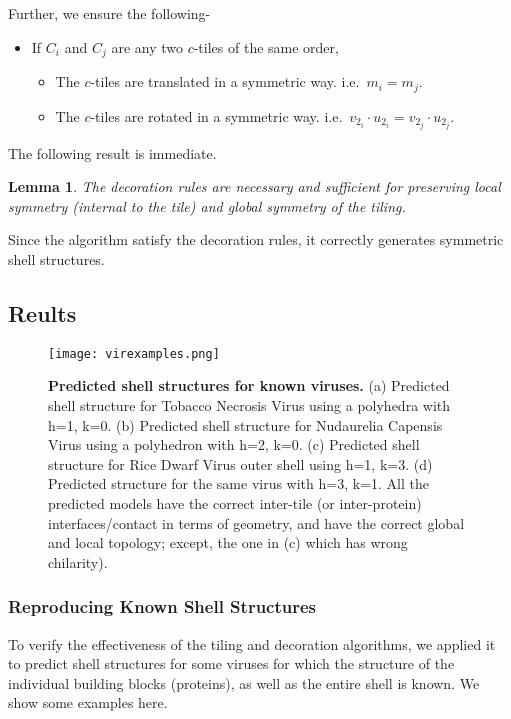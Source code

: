 \documentclass[11pt]{article}
\def\func#1{\textrm{\bf{\sc{#1}}}}
\newtheorem{lemma}[thm]{Lemma}
\newcommand{\1}{\mathds{1}}
\begin{document}
Further, we ensure the following-
\begin{itemize}
 \item If $C_i$ and $C_j$ are any two $c$-tiles of the same order,
   \begin{itemize}
      \item The $c$-tiles are translated in a symmetric way. i.e.\ $m_i = m_j$.
      \item The $c$-tiles are rotated in a symmetric way. i.e.\ $v_{2_i} \cdot u_{2_i} = v_{2_j} \cdot u_{2_j}$.
   \end{itemize}
\end{itemize}

The following result is immediate.

\begin{lemma}
 The decoration rules are necessary and sufficient for preserving local symmetry (internal to the tile) and global symmetry of the tiling.
\end{lemma}

Since the \func{ShellGen} algorithm satisfy the decoration rules, it correctly generates symmetric shell structures.


\subsection{Reults}

\begin{figure}[t!]
\centering
\vspace{-0.3cm}
 \texttt{[image: virexamples.png]}
\vspace{-0.2cm}
\caption[Predicted shell structures for known viruses] {\textbf{Predicted shell structures for known viruses.} (a) Predicted shell structure for Tobacco Necrosis Virus using a polyhedra with h=1, k=0. (b) Predicted shell structure for Nudaurelia Capensis Virus using a polyhedron with h=2, k=0. (c) Predicted shell structure for Rice Dwarf Virus outer shell using h=1, k=3. (d) Predicted structure for the same virus with h=3, k=1. All the predicted models have the correct inter-tile (or inter-protein) interfaces/contact in terms of geometry, and have the correct global and local topology; except, the one in (c) which has wrong chilarity).}
\vspace{-0.5cm}
\label{fig:assemblytheory:demo}
\end{figure}

\vspace{-0.5cm}
\subsubsection{Reproducing Known Shell Structures}
To verify the effectiveness of the tiling and decoration algorithms, we applied it to predict shell structures for some viruses for which the structure of the individual building blocks (proteins), as well as the entire shell is known. We show some examples here. 
\end{document}
